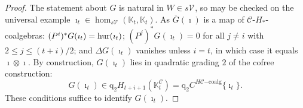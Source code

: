\documentclass[11pt]{amsart} \renewcommand{\baselinestretch}{1.4}
\theoremstyle{plain}
\theoremstyle{definition}
\newcommand{\DASH}{\mathrm{-}}
\renewcommand{\to}{\longrightarrow}
\newcommand{\calV}{\mathcal{V}}
\newcommand{\calc}{\mathcal{C}}
\newcommand{\vect}[2]{\calV^{#1}_{#2}}
\newcommand{\HC}[1]{H#1\mathrm{-coalg}}
\newcommand{\quadgrad}[1]{\mathrm{q}_{#1}}
\renewcommand{\mapsto}{\longmapsto}
\begin{document}
\begin{Operations on the Bousfield-Kan spectral sequence}
\begin{proof}
The statement about $G$ is natural in $W\in s\vect{}{}$, so may be checked on the universal example $\imath_t\in \hom_{s\vect{}{}}(\mathbb{K}_t,\mathbb{K}_t)$. As $\overline{G}(\imath)$ is a map of $\calc$-$H_*$-coalgebras: $(P^i)^*G(\imath_t)=\textup{hur}(\imath_t)$; $(P^j)^*G(\imath_t)=0$ for all $j\neq i$ with $2\leq j\leq (t+i)/2$; and $\Delta G(\imath_t)$ vanishes unless $i=t$, in which case it equals $\imath\otimes \imath$. By construction, $G(\imath_t)$ lies in quadratic grading $2$ of the cofree construction:
\[G(\imath_t)\in\quadgrad{2}H_{t+i+1}(\mathbb{K}^{\calc}_t)=\quadgrad{2}C^{\HC{\calc}}\{\imath_t\}.\]
These conditions suffice to identify $G(\imath_t)$.
%
\end{proof}






\end{Operations on the Bousfield-Kan spectral sequence}
\end{document}
